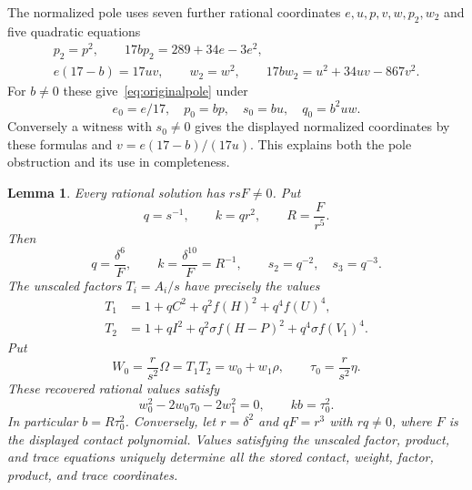 \documentclass[11pt,a4paper]{article}
\newtheorem{lemma}[theorem]{Lemma}
\begin{document}
The normalized pole uses seven further rational coordinates
$e,u,p,v,w,p_2,w_2$ and five quadratic equations
\begin{equation}\label{eq:normalizedpole}
 \begin{gathered}
 p_2=p^2,\qquad 17bp_2=289+34e-3e^2,\\
 e(17-b)=17uv,\qquad w_2=w^2,\qquad
 17bw_2=u^2+34uv-867v^2.
 \end{gathered}
\end{equation}
For $b\ne0$ these give~\eqref{eq:originalpole} under
\[
 e_0=e/17,\quad p_0=bp,\quad s_0=bu,\quad q_0=b^2uw.
\]
Conversely a witness with $s_0\ne0$ gives the displayed normalized
coordinates by these formulas and $v=e(17-b)/(17u)$.
This explains both the pole obstruction and its use in completeness.


\begin{lemma}\label{lem:domain}
Every rational solution has $rsF\ne0$. Put
\[
 q=s^{-1},\qquad k=qr^2,\qquad R=\frac{F}{r^5}.
\]
Then
\[
 q=\frac{\delta^6}{F},\qquad k=\frac{\delta^{10}}F=R^{-1},
 \qquad s_2=q^{-2},\quad s_3=q^{-3}.
\]
The unscaled factors $T_i=A_i/s$ have precisely the values
\begin{equation}\label{eq:packed}
\begin{split}
 T_1&=1+qC^2+q^2f(H)^2+q^4f(U)^4,\\
 T_2&=1+qI^2+q^2\sigma f(H-P)^2+q^4\sigma f(V_1)^4.
\end{split}
\end{equation}
Put
\[
 W_0=\frac r{s^2}\Omega=T_1T_2=w_0+w_1\rho,
 \qquad \tau_0=\frac r{s^2}\eta.
\]
These recovered rational values satisfy
\begin{equation}\label{eq:trace}
                  w_0^2-2w_0\tau_0-2w_1^2=0,
                  \qquad kb=\tau_0^2.
\end{equation}
In particular $b=R\tau_0^2$. Conversely, let $r=\delta^2$ and
$qF=r^3$ with $rq\ne0$, where $F$ is the displayed contact polynomial.
Values satisfying the unscaled factor, product, and trace equations
uniquely determine all the stored contact, weight, factor, product,
and trace coordinates.
\end{lemma}
\end{document}
